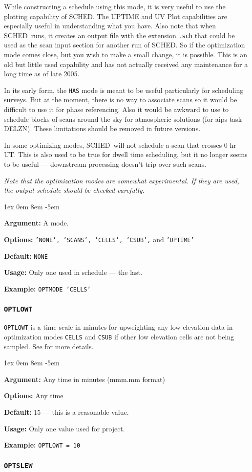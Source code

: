 \documentclass{report}
\newcommand{\sched}{{\sc SCHED}}
\newcommand{\schedb}{{\sc SCHED~}}
\newcommand{\rcwbox}[5]{
  \begin{list}{}{\parsep 1ex  \itemsep 0em
                 \leftmargin 8em  \itemindent -5em }
    \item {\bf Argument:} #1
    \item {\bf Options:}  #2
    \item {\bf Default:}  #3
    \item {\bf Usage:}    #4
    \item {\bf Example:}  #5
  \end{list}
}
\begin{document}
\begin{description}
While constructing a schedule using this mode, it is very useful to
use the plotting capability of \sched.  The UPTIME and UV Plot capabilities
are especially useful in understanding what you have.  Also note that
when \schedb runs, it creates an output file with the extension {\tt .sch}
that could be used as the scan input section for another run of \sched.
So if the optimization mode comes close, but you wish to make a small change,
it is possible.  This is an old but little used capability and has not
actually received any maintenance for a long time as of late 2005.


In its early form, the {\tt HAS} mode is meant to be useful particularly for
scheduling surveys.  But at the moment, there is no way to associate scans
so it would be difficult to use it for phase referencing.  Also it would
be awkward to use to schedule blocks of scans around the sky for atmospheric
solutions (for aips task DELZN).  These limitations should be removed
in future versions.

\end{description}

In some optimizing modes, \schedb will not schedule a scan that crosses
0 hr UT.  This is also used to be true for dwell time scheduling, but it
no longer seems to be useful --- downstream processing doesn't trip over
such scans.

{\sl Note that the optimization modes are somewhat experimental.  If
they are used, the output schedule should be checked carefully.}

\rcwbox
{A mode.}
{{\tt 'NONE', 'SCANS', 'CELLS', 'CSUB',} and {\tt 'UPTIME'}}
{\tt NONE}
{Only one used in schedule --- the last.}
{{\tt OPTMODE 'CELLS'}}


\subsubsection{\label{MP:OPTLOWT}{\tt OPTLOWT}}

{\tt OPTLOWT} is a time scale in minutes for upweighting any low
elevation data in optimization modes {\tt CELLS} and {\tt CSUB} if
other low elevation cells are not being sampled.  See  for more details.

\rcwbox
{Any time in minutes (mmm.mm format) }
{Any time}
{15 --- this is a reasonable value.}
{Only one value used for project.}
{{\tt OPTLOWT = 10}}

\subsubsection{\label{MP:OPTSLEW}{\tt OPTSLEW}}
\end{document}
